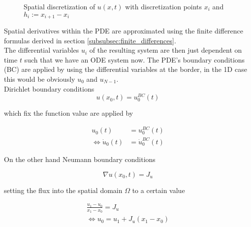 \documentclass{scrartcl}[12pt, halfparskip]
\numberwithin{equation}{section}
\numberwithin{figure}{section}
\numberwithin{table}{section}
\begin{document}
\begin{figure}[H]
	\centering
	\caption{Spatial discretization of $u(x,t)$ with discretization points $x_i$ and $h_i:=x_{i+1} - x_i$}
	\label{fig:pde_discretization_method_of_lines}
\end{figure}


Spatial derivatives within the PDE are approximated using the finite difference formulas derived in section \ref{subsubsec:finite_differences}. \\
The differential variables $u_i$ of the resulting system are then just dependent on time $t$ such that we have an ODE system now. The PDE's boundary conditions (BC) are applied by using the differential variables at the border, in the 1D case this would be obviously $u_0$ and $u_{N-1}$. \\
Dirichlet boundary conditions 
\begin{equation}
u(x_0, t) = u_0^{BC}(t)
\end{equation}

which fix the function value are applied by

\begin{align}
	u_0(t) & = u_0^{BC}(t) \\
	\Leftrightarrow \dot{u}_0(t) & = \dot{u}_0^{BC}(t) \nonumber
\end{align}

On the other hand Neumann boundary conditions

\begin{equation}
	\nabla u(x_{0},t) = J_u
\end{equation}

setting the flux into the spatial domain $\Omega$ to a certain value

\begin{align}
	\frac{u_{1} - u_{0}}{x_{1} - x_{0}} = J_u  \\
	\Leftrightarrow u_0 = u_1 + J_u (x_1 - x_0) \nonumber
\end{align}
\end{document}
